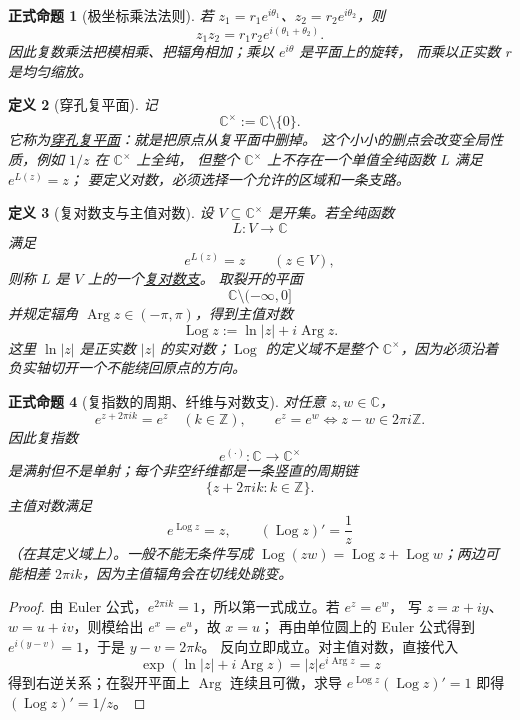\documentclass[UTF8,fontset=none,a4paper,11pt]{ctexart}
\theoremstyle{foundation-definition}
\newtheorem{definition}{定义}[section]
\theoremstyle{foundation-theorem}
\theoremstyle{foundation-proposition}
\newtheorem{proposition}[definition]{正式命题}
\theoremstyle{foundation-example}
\theoremstyle{foundation-remark}
\theoremstyle{foundation-theorem}
\newcommand{\term}[2]{\hyperref[#1]{#2}}
\begin{document}
\begin{proposition}[极坐标乘法法则]\label{prop:polar-multiplication}
若 \(z_1=r_1e^{i\theta_1}\)、\(z_2=r_2e^{i\theta_2}\)，则
\[
z_1z_2=r_1r_2e^{i(\theta_1+\theta_2)}.
\]
因此复数乘法把模相乘、把辐角相加；乘以 \(e^{i\theta}\) 是平面上的旋转，
而乘以正实数 \(r\) 是均匀缩放。
\end{proposition}

\begin{definition}[穿孔复平面]\label{def:punctured-plane}
记
\[
\mathbb C^\times:=\mathbb C\setminus\{0\}.
\]
它称为\term{def:punctured-plane}{穿孔复平面}：就是把原点从复平面中删掉。
这个小小的删点会改变全局性质，例如 \(1/z\) 在 \(\mathbb C^\times\) 上全纯，
但整个 \(\mathbb C^\times\) 上不存在一个单值全纯函数 \(L\) 满足 \(e^{L(z)}=z\)；
要定义对数，必须选择一个允许的区域和一条支路。
\end{definition}

\begin{definition}[复对数支与主值对数]\label{def:complex-logarithm}
设 \(V\subseteq\mathbb C^\times\) 是开集。若全纯函数
\[
L:V\longrightarrow\mathbb C
\]
满足
\[
e^{L(z)}=z\qquad(z\in V),
\]
则称 \(L\) 是 \(V\) 上的一个\term{def:complex-logarithm}{复对数支}。
取裂开的平面
\[
\mathbb C\setminus(-\infty,0]
\]
并规定辐角 \(\operatorname{Arg}z\in(-\pi,\pi)\)，得到主值对数
\[
\operatorname{Log} z:=\ln|z|+i\operatorname{Arg}z.
\]
这里 \(\ln|z|\) 是正实数 \(|z|\) 的实对数；\(\operatorname{Log}\) 的定义域不是整个
\(\mathbb C^\times\)，因为必须沿着负实轴切开一个不能绕回原点的方向。
\end{definition}

\begin{proposition}[复指数的周期、纤维与对数支]\label{prop:complex-exponential-fibers}
对任意 \(z,w\in\mathbb C\)，
\[
e^{z+2\pi i k}=e^z\quad(k\in\mathbb Z),
\qquad
e^z=e^w\Longleftrightarrow z-w\in2\pi i\mathbb Z.
\]
因此复指数
\[
e^{(\cdot)}:\mathbb C\longrightarrow\mathbb C^\times
\]
是满射但不是单射；每个非空纤维都是一条竖直的周期链
\[
\{z+2\pi i k:k\in\mathbb Z\}.
\]
主值对数满足
\[
e^{\operatorname{Log} z}=z,\qquad (\operatorname{Log} z)'=\frac1z
\]
（在其定义域上）。一般不能无条件写成
\(\operatorname{Log}(zw)=\operatorname{Log} z+\operatorname{Log} w\)；两边可能相差 \(2\pi i k\)，因为主值辐角会在切线处跳变。
\end{proposition}

\begin{proof}
由 Euler 公式，\(e^{2\pi i k}=1\)，所以第一式成立。若 \(e^z=e^w\)，
写 \(z=x+iy\)、\(w=u+iv\)，则模给出 \(e^x=e^u\)，故 \(x=u\)；
再由单位圆上的 Euler 公式得到 \(e^{i(y-v)}=1\)，于是 \(y-v=2\pi k\)。
反向立即成立。对主值对数，直接代入
\[
\exp(\ln|z|+i\operatorname{Arg} z)=|z|e^{i\operatorname{Arg} z}=z
\]
得到右逆关系；在裂开平面上 \(\operatorname{Arg}\) 连续且可微，求导
\(e^{\operatorname{Log} z}(\operatorname{Log} z)'=1\) 即得 \((\operatorname{Log} z)'=1/z\)。
\end{proof}
\end{document}
